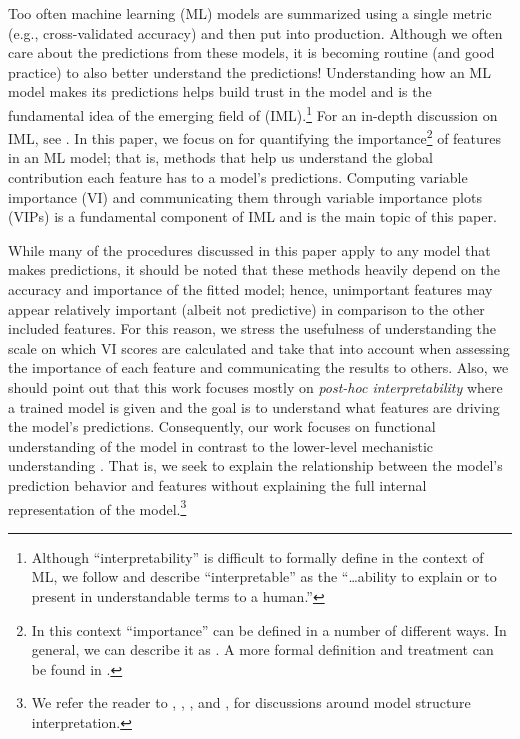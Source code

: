 Too often machine learning (ML) models are summarized using a single
metric (e.g., cross-validated accuracy) and then put into production.
Although we often care about the predictions from these models, it is
becoming routine (and good practice) to also better understand the
predictions! Understanding how an ML model makes its predictions helps
build trust in the model and is the fundamental idea of the emerging
field of  (IML).\footnote{Although
  ``interpretability'' is difficult to formally define in the context of
  ML, we follow \citet{doshivelez-2017-rigorous} and describe
  ``interpretable'' as the ``\ldots ability to explain or to present in
  understandable terms to a human.''} For an in-depth discussion on IML,
see \citet{molnar-2019-iml}. In this paper, we focus on
 for quantifying the importance\footnote{In this
  context ``importance'' can be defined in a number of different ways.
  In general, we can describe it as
  .
  A more formal definition and treatment can be found in
  \citet{laan-2006-statistical}.} of features in an ML model; that is,
methods that help us understand the global contribution each feature has
to a model's predictions. Computing variable importance (VI) and
communicating them through variable importance plots (VIPs) is a
fundamental component of IML and is the main topic of this paper.

While many of the procedures discussed in this paper apply to any model
that makes predictions, it should be noted that these methods heavily
depend on the accuracy and importance of the fitted model; hence,
unimportant features may appear relatively important (albeit not
predictive) in comparison to the other included features. For this
reason, we stress the usefulness of understanding the scale on which VI
scores are calculated and take that into account when assessing the
importance of each feature and communicating the results to others.
Also, we should point out that this work focuses mostly on
\emph{post-hoc interpretability} where a trained model is given and the
goal is to understand what features are driving the model's predictions.
Consequently, our work focuses on functional understanding of the model
in contrast to the lower-level mechanistic understanding
\citep{montavon-2018-methods}. That is, we seek to explain the
relationship between the model's prediction behavior and features
without explaining the full internal representation of the
model.\footnote{We refer the reader to \citet{poulin-2006-visual},
  \citet{caruana-2015-intelligible},
  \citet{bibal-2016-intterpretability}, and \citet{bau-2017-network},
  for discussions around model structure interpretation.}

